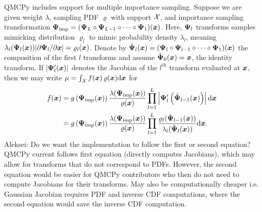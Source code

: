 \documentclass[graybox,footinfo]{svmult}
\newcommand{\AGSComment}[1]{{\color{cyan} Aleksei: #1}}
\newcommand{\IMP}{\textup{imp}}
\begin{document}
QMCPy includes support for multiple importance sampling. Suppose we are given weight $\lambda$, sampling PDF $\varrho$ with support ${\mathcal{X}}$, and importance sampling transformation $\bsPsi_\IMP = (\bsPsi_L \circ \bsPsi_{L-1} \circ \dots \circ \bsPsi_1)(\bsx)$. Here, ${\boldsymbol{\Psi}}_l$ transforms samples mimicking distribution $\varrho_l$ to mimic probability density $\lambda_l$, meaning $\lambda_l({\boldsymbol{\Psi}}_l({\boldsymbol{x}}))\lvert \partial {\boldsymbol{\Psi}}_l / \partial {\boldsymbol{x}} \rvert = \varrho_l({\boldsymbol{x}})$. Denote by $\hat{{\boldsymbol{\Psi}}}_l({\boldsymbol{x}})=({\boldsymbol{\Psi}}_l \circ {\boldsymbol{\Psi}}_{l-1} \circ \dots \circ {\boldsymbol{\Psi}}_1)({\boldsymbol{x}})$ the composition of the first $l$ transforms and assume $\hat{{\boldsymbol{\Psi}}}_0({\boldsymbol{x}})={\boldsymbol{x}}$, the identity transform. If $\lvert {\boldsymbol{\Psi}}_l'({\boldsymbol{x}}) \rvert$ denotes the Jacobian of the $l^{\text{th}}$ transform evaluated at ${\boldsymbol{x}}$, then we may write $\mu =  \int_{{\mathcal{X}}}f({\boldsymbol{x}}) \, \varrho({\boldsymbol{x}}) \mathrm{d} {\boldsymbol{x}}$ for 
\begin{align*}
 f(\bsx) 
 &= g\left(\bsPsi_\IMP(\bsx)\right)\frac{\lambda(\bsPsi_\IMP(\bsx))}{\varrho(\bsx)}\prod_{l=1}^L \left\lvert \bsPsi_l'\left(\hat{\bsPsi}_{l-1}(\bsx)\right) \right\rvert \D \bsx \\
 &= g\left(\bsPsi_\IMP(\bsx)\right)\frac{\lambda(\bsPsi_\IMP(\bsx))}{\varrho(\bsx)}\prod_{l=1}^L \frac{\varrho_l(\hat{\bsPsi}_{l-1}(\bsx))}{\lambda_l(\hat{\bsPsi}_l(\bsx))} \D \bsx.
\end{align*}
\AGSComment{Do we want the implementation to follow the first or second equation? QMCPy current follows first equation (directly computes Jacobians), which may allow for transforms that do not correspond to PDFs. However, the second equation would be easier for QMCPy contributors who then do not need to compute Jacobians for their transforms. May also be computationally cheaper i.e. Gaussian Jacobian requires PDF and inverse CDF computations, where the second equation would save the inverse CDF computation.}
\end{document}
